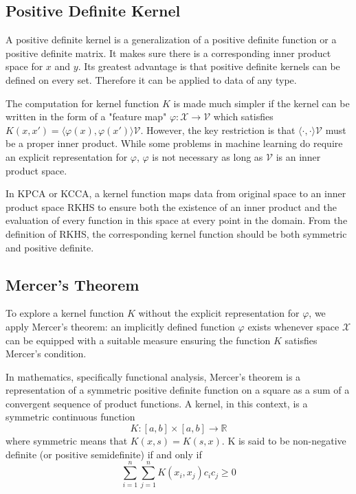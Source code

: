 \documentclass[12pt]{report} %
\begin{document}
\subsection{Positive Definite Kernel}
A positive definite kernel is a generalization of a positive definite function or a positive definite matrix. It makes sure there is a corresponding inner product space for $x$ and $y$. Its greatest advantage is that positive definite kernels can be defined on every set. Therefore it can be applied to data of any type.

The computation for kernel function $K$ is made much simpler if the kernel can be written in the form of a "feature map" $\varphi:\mathcal{X}\to\mathcal{V}$ which satisfies $K(x,x')=\langle \varphi (x), \varphi (x') \rangle \mathcal{V}$. However, the key restriction is that $\langle \cdot, \cdot \rangle \mathcal{V}$ must be a proper inner product. While some problems in machine learning do require an explicit representation for $\varphi$, $\varphi$ is not necessary as long as $\mathcal{V}$ is an inner product space\cite{PD}.

In KPCA or KCCA, a kernel function maps data from original space to an inner product space RKHS to ensure both the existence of an inner product and the evaluation of every function in this space at every point in the domain. From the definition of RKHS, the corresponding kernel function should be both symmetric and positive definite\cite{RKHS}.

\subsection{Mercer's Theorem}
To explore a kernel function $K$ without the explicit representation for $\varphi$, we apply Mercer's theorem: an implicitly defined function $\varphi$ exists whenever space $\mathcal {X}$ can be equipped with a suitable measure ensuring the function $K$ satisfies Mercer's condition.

In mathematics, specifically functional analysis, Mercer's theorem is a representation of a symmetric positive definite function on a square as a sum of a convergent sequence of product functions\cite{MT}. A kernel, in this context, is a symmetric continuous function
\begin{equation}
K:[a,b] \times [a,b] \rightarrow \mathbb {R}
\end{equation}
where symmetric means that \( K(x, s) = K(s, x)\).
K is said to be non-negative definite (or positive semidefinite) if and only if
\begin{equation}
\sum _{i=1}^{n}\sum _{j=1}^{n}K(x_{i},x_{j})c_{i}c_{j}\geq 0
\end{equation}
\end{document}
